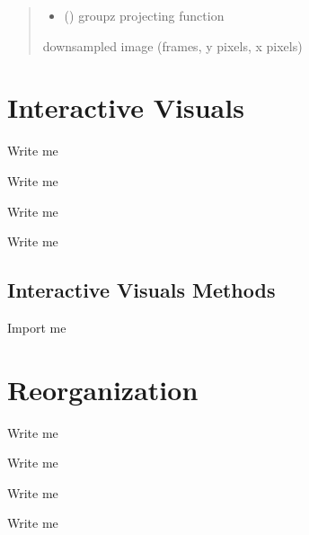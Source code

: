 \documentclass[letterpaper,10pt,english]{sphinxmanual}
\begin{document}
\begin{fulllineitems}
\begin{quote}
\begin{description}
\begin{itemize}
\item {} 
\sphinxAtStartPar
{} () \sphinxhyphen{}\sphinxhyphen{} group\sphinxhyphen{}z projecting function

\end{itemize}

\sphinxAtStartPar
downsampled image (frames, y pixels, x pixels)

\sphinxAtStartPar
{}

\end{description}\end{quote}

\end{fulllineitems}



\section{Interactive Visuals}
\label{\detokenize{Sub-Packages:interactive-visuals}}\label{\detokenize{Sub-Packages:interactive-visuals-module}}
\begin{DUlineblock}{0em}
\item[] Write me
\item[] Write me
\item[] Write me
\item[] Write me
\end{DUlineblock}


\subsection{Interactive Visuals Methods}
\label{\detokenize{Sub-Packages:interactive-visuals-methods}}
\begin{DUlineblock}{0em}
\item[] Import me
\end{DUlineblock}


\section{Reorganization}
\label{\detokenize{Sub-Packages:reorganization}}\label{\detokenize{Sub-Packages:reorganization-module}}
\begin{DUlineblock}{0em}
\item[] Write me
\item[] Write me
\item[] Write me
\item[] Write me
\end{DUlineblock}
\end{document}
